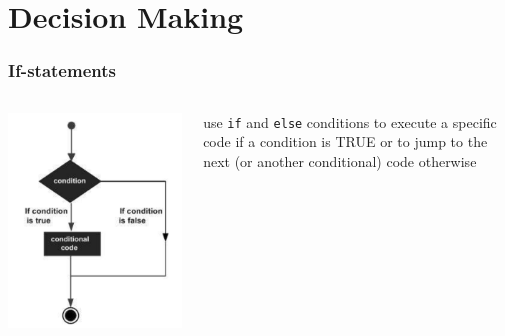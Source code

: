 \documentclass{beamer}
\begin{document}
\section{Decision Making}

\begin{frame}
\frametitle{If-statements}
	\begin{columns}[T]
	\begin{column}[T]{5cm}
			\includegraphics[width = 1\textwidth]{DecisionMaking.pdf}
		\end{column}
		\begin{column}[T]{3cm}
			use \texttt{if} and \texttt{else} conditions to execute a specific code if a condition is TRUE or to jump to the next (or another conditional) code otherwise	
		\end{column}	
	\end{columns}
\end{frame}
\end{document}
